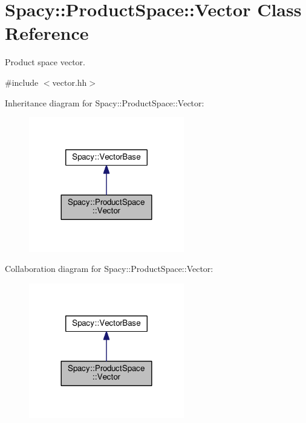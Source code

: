 \hypertarget{classSpacy_1_1ProductSpace_1_1Vector}{}\section{Spacy\+:\+:Product\+Space\+:\+:Vector Class Reference}
\label{classSpacy_1_1ProductSpace_1_1Vector}


Product space vector.  




{\ttfamily \#include $<$vector.\+hh$>$}



Inheritance diagram for Spacy\+:\+:Product\+Space\+:\+:Vector\+:\nopagebreak
\begin{figure}[H]
\begin{center}
\leavevmode
\includegraphics[width=192pt]{classSpacy_1_1ProductSpace_1_1Vector__inherit__graph}
\end{center}
\end{figure}


Collaboration diagram for Spacy\+:\+:Product\+Space\+:\+:Vector\+:\nopagebreak
\begin{figure}[H]
\begin{center}
\leavevmode
\includegraphics[width=192pt]{classSpacy_1_1ProductSpace_1_1Vector__coll__graph}
\end{center}
\end{figure}
